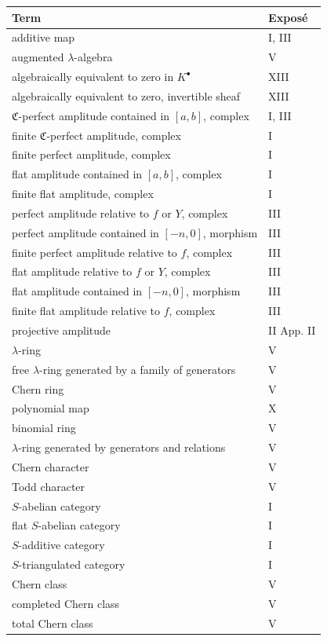 \documentclass[12pt]{article}
\begin{document}
\begin{longtable}{p{8.5cm}l}
\toprule
\textbf{Term} & \textbf{Exposé}\\
\midrule
\endhead
additive map & I, III\\
augmented $\lambda$-algebra & V\\
algebraically equivalent to zero in $K^\bullet$ & XIII\\
algebraically equivalent to zero, invertible sheaf & XIII\\
$\mathfrak C$-perfect amplitude contained in $[a,b]$, complex & I, III\\
finite $\mathfrak C$-perfect amplitude, complex & I\\
finite perfect amplitude, complex & I\\
flat amplitude contained in $[a,b]$, complex & I\\
finite flat amplitude, complex & I\\
perfect amplitude relative to $f$ or $Y$, complex & III\\
perfect amplitude contained in $[-n,0]$, morphism & III\\
finite perfect amplitude relative to $f$, complex & III\\
flat amplitude relative to $f$ or $Y$, complex & III\\
flat amplitude contained in $[-n,0]$, morphism & III\\
finite flat amplitude relative to $f$, complex & III\\
projective amplitude & II App. II\\
$\lambda$-ring & V\\
free $\lambda$-ring generated by a family of generators & V\\
Chern ring & V\\
polynomial map & X\\
binomial ring & V\\
$\lambda$-ring generated by generators and relations & V\\
Chern character & V\\
Todd character & V\\
$S$-abelian category & I\\
flat $S$-abelian category & I\\
$S$-additive category & I\\
$S$-triangulated category & I\\
Chern class & V\\
completed Chern class & V\\
total Chern class & V\\

\end{longtable}
\end{document}
